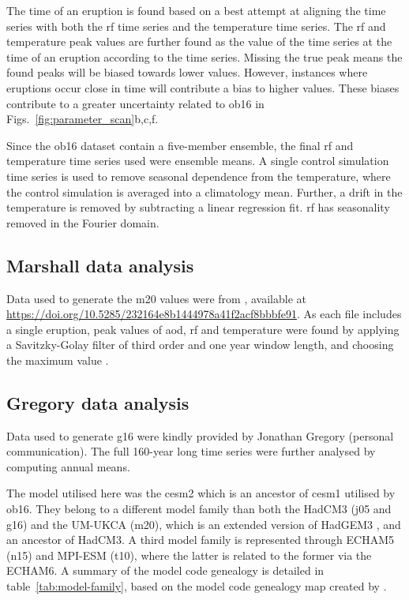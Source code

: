 \documentclass{ametsocV6.1}
\begin{document}
The time of an eruption is found based on a best attempt at aligning the  time
series with both the \gls{rf} time series and the temperature time series. The \gls{rf}
and temperature peak values are further found as the value of the time series at the
time of an eruption according to the  time series. Missing the true peak means
the found peaks will be biased towards lower values. However, instances where eruptions
occur close in time will contribute a bias to higher values. These biases contribute to
a greater uncertainty related to \gls{ob16} in Figs.~\ref{fig:parameter_scan}b,c,f.

Since the \gls{ob16} dataset contain a five-member ensemble, the final \gls{rf} and
temperature time series used were ensemble means. A single control simulation time
series is used to remove seasonal dependence from the temperature, where the control
simulation is averaged into a climatology mean. Further, a drift in the temperature is
removed by subtracting a linear regression fit. \gls{rf} has seasonality removed in the
Fourier domain.

\subsection{Marshall data analysis}\label{ap:m20}

Data used to generate the \gls{m20} values were from \citet{marshall2020dataset},
available at \url{https://doi.org/10.5285/232164e8b1444978a41f2acf8bbbfe91}. As each
file includes a single eruption, peak values of \gls{aod}, \gls{rf} and temperature were
found by applying a Savitzky-Golay filter of third order and one year window length, and
choosing the maximum value \citep{savitzky1964}.

\subsection{Gregory data analysis}\label{ap:g16}

Data used to generate \gls{g16} were kindly provided by Jonathan Gregory (personal
communication). The full 160-year long time series were further analysed by computing
annual means.

\appendix[C]


The model utilised here was the \gls{cesm2} which is an ancestor of \gls{cesm1} utilised
by \gls{ob16}. They belong to a different model family than both the HadCM3 (\gls{j05}
and \gls{g16}) and the UM-UKCA (\gls{m20}), which is an extended version of HadGEM3
\citep{dhomse2014}, and an ancestor of HadCM3. A third model family is represented
through ECHAM5 (\gls{n15}) and MPI-ESM (\gls{t10}), where the latter is related to the
former via the ECHAM6. A summary of the model code genealogy is detailed in
table~\ref{tab:model-family}, based on the model code genealogy map created by
\citet{kuma2023}.
\end{document}
